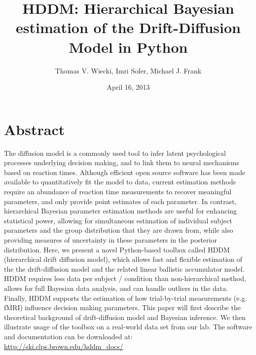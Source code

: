 \documentclass[letterpaper,10pt,english]{sphinxmanual}
\title{HDDM: Hierarchical Bayesian estimation of the Drift-Diffusion Model in Python}
\date{April 16, 2013}
\author{Thomas V. Wiecki, Imri Sofer, Michael J. Frank}
\begin{document}
\maketitle

\section{Abstract}
\label{abstract:abstract}
The diffusion model is a commonly used tool to infer latent psychological processes underlying decision making, and to link them to neural mechanisms based on reaction times. Although efficient open source software has been made available to quantitatively fit the model to data, current estimation methods require an abundance of reaction time measurements to recover meaningful parameters, and only provide point estimates of each parameter.  In contrast, hierarchical Bayesian parameter estimation methods are useful for enhancing statistical power, allowing for simultaneous estimation of individual subject parameters and the group distribution that they are drawn from, while also providing measures of uncertainty in these parameters in the posterior distribution. Here, we present a novel Python-based toolbox called HDDM (hierarchical drift diffusion model), which allows fast and flexible estimation of the the drift-diffusion model and the related linear ballistic accumulator model. HDDM requires less data per subject / condition than non-hierarchical method, allows for full Bayesian data analysis, and can handle outliers in the data.  Finally, HDDM supports the estimation of how trial-by-trial measurements (e.g. fMRI) influence decision making parameters. This paper will first describe the theoretical background of drift-diffusion model and Bayesian inference. We then illustrate usage of the toolbox on a real-world data set from our lab. The software and documentation can be downloaded at: \href{http://ski.clps.brown.edu/hddm\_docs/}{http://ski.clps.brown.edu/hddm\_docs/}

\end{document}
